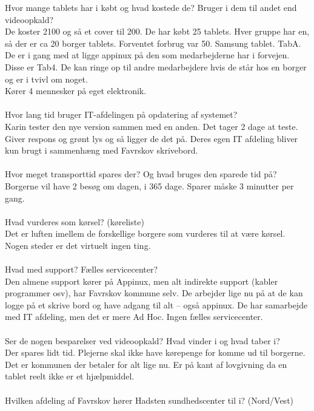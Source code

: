 Hvor mange tablets har i købt og hvad kostede de? Bruger i dem til andet end videoopkald?\\
De koster 2100 og så et cover til 200. De har købt 25 tablets. Hver gruppe har en, så der er ca 20 borger tablets. Forventet forbrug var 50. Samsung tablet. TabA. \\
De er i gang med at ligge appinux på den som medarbejderne har i forvejen. Disse er Tab4. De kan ringe op til andre medarbejdere hvis de står hos en borger og er i tvivl om noget. \\
Kører 4 mennesker på eget elektronik. \\\\
Hvor lang tid bruger IT-afdelingen på opdatering af systemet? \\
Karin tester den nye version sammen med en anden. Det tager 2 dage at teste. Giver respons og grønt lys og så ligger de det på. Deres egen IT afdeling bliver kun brugt i sammenhæng med Favrskov skrivebord.\\\\ 
Hvor meget transporttid spares der? Og hvad bruges den sparede tid på?\\
Borgerne vil have 2 besøg om dagen, i 365 dage. Sparer måske 3 minutter per gang. \\\\
Hvad vurderes som kørsel? (køreliste) \\
Det er luften imellem de forskellige borgere som vurderes til at være kørsel. Nogen steder er det virtuelt ingen ting. \\\\
Hvad med support? Fælles servicecenter?\\
Den almene support kører på Appinux, men alt indirekte support (kabler programmer osv), har Favrskov kommune selv. De arbejder lige nu på at de kan logge på et skrive bord og have adgang til alt – også appinux. De har samarbejde med IT afdeling, men det er mere Ad Hoc. Ingen fælles servicecenter. \\\\
Ser de nogen besparelser ved videoopkald? Hvad vinder i og hvad taber i? \\
Der spares lidt tid. Plejerne skal ikke have kørepenge for komme ud til borgerne. \\
Det er kommunen der betaler for alt lige nu. Er på kant af lovgivning da en tablet reelt ikke er et hjælpmiddel. \\\\
Hvilken afdeling af Favrskov hører Hadsten sundhedscenter til i? (Nord/Vest)\\
